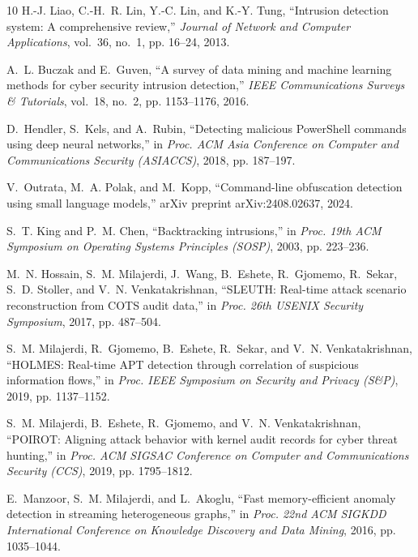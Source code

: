 \documentclass[conference]{IEEEtran}
\begin{document}
\begin{thebibliography}{10}
H.-J. Liao, C.-H.~R. Lin, Y.-C. Lin, and K.-Y. Tung, ``Intrusion detection
  system: A comprehensive review,'' \emph{Journal of Network and Computer
  Applications}, vol.~36, no.~1, pp. 16--24, 2013.

A.~L. Buczak and E.~Guven, ``A survey of data mining and machine learning
  methods for cyber security intrusion detection,'' \emph{IEEE Communications
  Surveys \& Tutorials}, vol.~18, no.~2, pp. 1153--1176, 2016.

D.~Hendler, S.~Kels, and A.~Rubin, ``Detecting malicious {PowerShell} commands
  using deep neural networks,'' in \emph{Proc. ACM Asia Conference on Computer
  and Communications Security (ASIACCS)}, 2018, pp. 187--197.

V.~Outrata, M.~A. Polak, and M.~Kopp, ``Command-line obfuscation detection
  using small language models,'' arXiv preprint arXiv:2408.02637, 2024.

S.~T. King and P.~M. Chen, ``Backtracking intrusions,'' in \emph{Proc. 19th ACM
  Symposium on Operating Systems Principles (SOSP)}, 2003, pp. 223--236.

M.~N. Hossain, S.~M. Milajerdi, J.~Wang, B.~Eshete, R.~Gjomemo, R.~Sekar, S.~D.
  Stoller, and V.~N. Venkatakrishnan, ``{SLEUTH}: Real-time attack scenario
  reconstruction from {COTS} audit data,'' in \emph{Proc. 26th USENIX Security
  Symposium}, 2017, pp. 487--504.

S.~M. Milajerdi, R.~Gjomemo, B.~Eshete, R.~Sekar, and V.~N. Venkatakrishnan,
  ``{HOLMES}: Real-time {APT} detection through correlation of suspicious
  information flows,'' in \emph{Proc. IEEE Symposium on Security and Privacy
  (S\&P)}, 2019, pp. 1137--1152.

S.~M. Milajerdi, B.~Eshete, R.~Gjomemo, and V.~N. Venkatakrishnan, ``{POIROT}:
  Aligning attack behavior with kernel audit records for cyber threat
  hunting,'' in \emph{Proc. ACM SIGSAC Conference on Computer and
  Communications Security (CCS)}, 2019, pp. 1795--1812.

E.~Manzoor, S.~M. Milajerdi, and L.~Akoglu, ``Fast memory-efficient anomaly
  detection in streaming heterogeneous graphs,'' in \emph{Proc. 22nd ACM SIGKDD
  International Conference on Knowledge Discovery and Data Mining}, 2016, pp.
  1035--1044.


\end{thebibliography}
\end{document}
